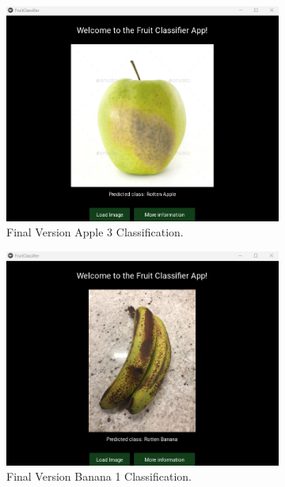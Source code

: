 \documentclass[conference]{IEEEtran}
\begin{document}
\begin{figure}[h]
    \hfill
    \begin{subfigure}[b]{0.48\linewidth}
        \centering
        \includegraphics[width=\linewidth]{Mlayer appelR3.png}
        \caption{Final Version Apple 3 Classification.}
        \label{figFB}
    \end{subfigure}
    \hfill
    \begin{subfigure}[b]{0.48\linewidth}
        \centering
        \includegraphics[width=\linewidth]{Mlayer bananaR1.png}
        \caption{Final Version Banana 1 Classification.}
        \label{figFA}
    \end{subfigure}
    \hfill
    \begin{subfigure}[b]{0.48\linewidth}

\end{subfigure}
\end{figure}
\end{document}
